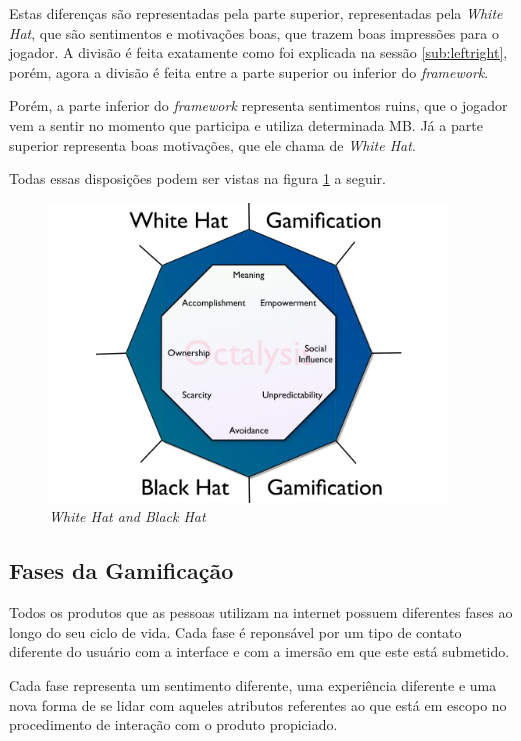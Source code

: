 Estas diferenças são representadas pela parte superior, representadas
pela \textit{White Hat}, que são sentimentos e motivações boas, que trazem
boas impressões para o jogador. A divisão é feita exatamente como
foi explicada na sessão \ref{sub:leftright}, porém, agora a
divisão é feita entre a parte superior ou inferior do \textit{framework}.

Porém, a parte inferior do \textit{framework} representa sentimentos ruins, que o jogador
vem a sentir no momento que participa e utiliza determinada MB. Já a
parte superior representa boas motivações, que ele chama de \textit{White Hat}.

Todas essas disposições podem ser vistas na figura
\ref{fig:octalysiswhiteblack} a seguir.

\begin{figure}[h]
    \centering
    \includegraphics[width=400px, scale=1]{figuras/octalysiswhiteblack}
    \caption{\textit{White Hat and Black Hat}}
    \label{fig:octalysiswhiteblack}
\end{figure}

\subsection{Fases da Gamificação}
\label{sub:fasesgamifição}
Todos os produtos que as pessoas utilizam na internet possuem diferentes
fases ao longo do seu ciclo de vida. Cada fase é reponsável por um tipo de contato diferente
do usuário com a interface e com a imersão em que este está submetido.

Cada fase representa um sentimento diferente, uma experiência diferente
e uma nova forma de se lidar com aqueles atributos referentes ao que está
em escopo no procedimento de interação com o produto propiciado.

